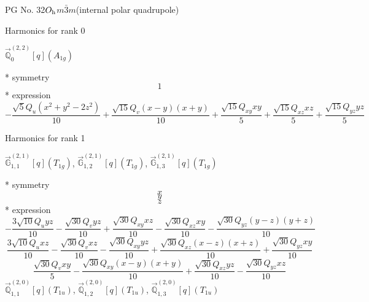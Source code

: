 \documentclass[fleqn,8pt]{jsarticle}
\begin{document}
\setcounter{MaxMatrixCols}{32}

\renewcommand{\tablename}{Table~}
\renewcommand{\figurename}{Figure~}
\begin{center}
\LARGE
PG No. 32\quad$O_{\rm h}$\quad$m\bar{3}m$\quad[ cubic ] (internal polar quadrupole)
\end{center}

\noindent * Harmonics for rank 0

\noindent\quad $\vec{\mathbb{Q}}_{0}^{(2,2)}[q](A_{1g})$

\noindent\quad ** symmetry
\begin{dmath*}
1
\end{dmath*}
\noindent\quad ** expression
\begin{dmath*}
- \frac{\sqrt{5} Q_{u} \left(x^{2} + y^{2} - 2 z^{2}\right)}{10} + \frac{\sqrt{15} Q_{v} \left(x - y\right) \left(x + y\right)}{10} + \frac{\sqrt{15} Q_{xy} x y}{5} + \frac{\sqrt{15} Q_{xz} x z}{5} + \frac{\sqrt{15} Q_{yz} y z}{5}
\end{dmath*}

\noindent * Harmonics for rank 1

\noindent\quad $\vec{\mathbb{G}}_{1,1}^{(2,1)}[q](T_{1g})$, $\vec{\mathbb{G}}_{1,2}^{(2,1)}[q](T_{1g})$, $\vec{\mathbb{G}}_{1,3}^{(2,1)}[q](T_{1g})$

\noindent\quad ** symmetry
\begin{dmath*}
x
\end{dmath*}
\begin{dmath*}
y
\end{dmath*}
\begin{dmath*}
z
\end{dmath*}
\noindent\quad ** expression
\begin{dmath*}
- \frac{3 \sqrt{10} Q_{u} y z}{10} - \frac{\sqrt{30} Q_{v} y z}{10} + \frac{\sqrt{30} Q_{xy} x z}{10} - \frac{\sqrt{30} Q_{xz} x y}{10} - \frac{\sqrt{30} Q_{yz} \left(y - z\right) \left(y + z\right)}{10}
\end{dmath*}
\begin{dmath*}
\frac{3 \sqrt{10} Q_{u} x z}{10} - \frac{\sqrt{30} Q_{v} x z}{10} - \frac{\sqrt{30} Q_{xy} y z}{10} + \frac{\sqrt{30} Q_{xz} \left(x - z\right) \left(x + z\right)}{10} + \frac{\sqrt{30} Q_{yz} x y}{10}
\end{dmath*}
\begin{dmath*}
\frac{\sqrt{30} Q_{v} x y}{5} - \frac{\sqrt{30} Q_{xy} \left(x - y\right) \left(x + y\right)}{10} + \frac{\sqrt{30} Q_{xz} y z}{10} - \frac{\sqrt{30} Q_{yz} x z}{10}
\end{dmath*}
\noindent\quad $\vec{\mathbb{Q}}_{1,1}^{(2,0)}[q](T_{1u})$, $\vec{\mathbb{Q}}_{1,2}^{(2,0)}[q](T_{1u})$, $\vec{\mathbb{Q}}_{1,3}^{(2,0)}[q](T_{1u})$
\end{document}
